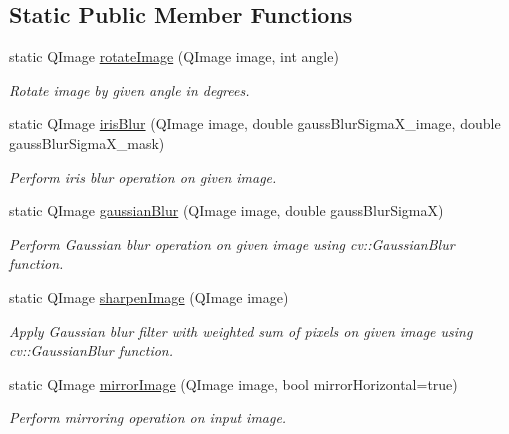\subsection*{Static Public Member Functions}
\begin{DoxyCompactItemize}
\item 
static Q\+Image \mbox{\hyperlink{class_minutiae_marker___data_augmentation_utils_a965c0c4cb55a60d410a5aee9e9bdcdef}{rotate\+Image}} (Q\+Image image, int angle)
\begin{DoxyCompactList}\small\item\em Rotate image by given angle in degrees. \end{DoxyCompactList}\item 
static Q\+Image \mbox{\hyperlink{class_minutiae_marker___data_augmentation_utils_afbbaf18bd05e76fd50301d769d1aa1ea}{iris\+Blur}} (Q\+Image image, double gauss\+Blur\+Sigma\+X\+\_\+image, double gauss\+Blur\+Sigma\+X\+\_\+mask)
\begin{DoxyCompactList}\small\item\em Perform iris blur operation on given image. \end{DoxyCompactList}\item 
static Q\+Image \mbox{\hyperlink{class_minutiae_marker___data_augmentation_utils_a2c31bbec754608bf96326e76811eab8b}{gaussian\+Blur}} (Q\+Image image, double gauss\+Blur\+SigmaX)
\begin{DoxyCompactList}\small\item\em Perform Gaussian blur operation on given image using cv\+::\+Gaussian\+Blur function. \end{DoxyCompactList}\item 
static Q\+Image \mbox{\hyperlink{class_minutiae_marker___data_augmentation_utils_a9124f9c3d2dde009af39a65110b37e75}{sharpen\+Image}} (Q\+Image image)
\begin{DoxyCompactList}\small\item\em Apply Gaussian blur filter with weighted sum of pixels on given image using cv\+::\+Gaussian\+Blur function. \end{DoxyCompactList}\item 
static Q\+Image \mbox{\hyperlink{class_minutiae_marker___data_augmentation_utils_ad76e4eae2b6769bfa023edc88e9fb3ae}{mirror\+Image}} (Q\+Image image, bool mirror\+Horizontal=true)
\begin{DoxyCompactList}\small\item\em Perform mirroring operation on input image. \end{DoxyCompactList}\end{DoxyCompactItemize}


